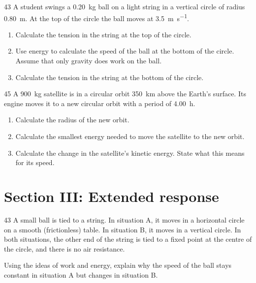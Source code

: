 \begin{practiceq}{4}{3}\label{pq:vertical}
A student swings a \qty{0.20}{kg} ball on a light string in a vertical circle of radius
\qty{0.80}{m}. At the top of the circle the ball moves at \qty{3.5}{m.s^{-1}}.
\begin{enumerate}[label=(\alph*)]
  \item Calculate the tension in the string at the top of the circle. 
  \item Use energy to calculate the speed of the ball at the bottom of the circle. Assume
        that only gravity does work on the ball. 
  \item Calculate the tension in the string at the bottom of the circle. 
\end{enumerate}
\end{practiceq}

\begin{practiceq}{4}{5}\label{pq:raise}
A \qty{900}{kg} satellite is in a circular orbit \qty{350}{km} above the Earth's surface.
Its engine moves it to a new circular orbit with a period of \qty{4.00}{h}.
\begin{enumerate}[label=(\alph*)]
  \item Calculate the radius of the new orbit. 
  \item Calculate the smallest energy needed to move the satellite to the new orbit.
  \item Calculate the change in the satellite's kinetic energy. State what this means for its
        speed. 
\end{enumerate}
\end{practiceq}

\section*{Section III: Extended response}

\begin{practiceq}{4}{3}\label{pq:workenergy}
A small ball is tied to a string. In situation A, it moves in a horizontal circle on a
smooth (frictionless) table. In situation B, it moves in a vertical circle. In both
situations, the other end of the string is tied to a fixed point at the centre of the circle,
and there is no air resistance.

Using the ideas of work and energy, explain why the speed of the ball stays constant in
situation A but changes in situation B.
\end{practiceq}

